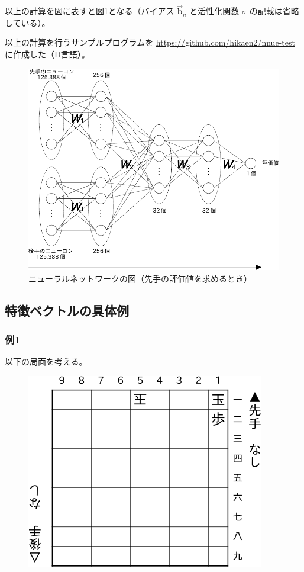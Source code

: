 \documentclass[11pt,a4paper]{ltjsarticle}
\begin{document}
以上の計算を図に表すと図\ref{fig4}となる（バイアス $\vec{\bm{b}}_n$ と活性化関数 $\sigma$ の記載は省略している）。

以上の計算を行うサンプルプログラムを \url{https://github.com/hikaen2/nnue-test} に作成した（D言語）。



\begin{figure}
  \centering
  \includegraphics[width=12cm]{fig/fig4.pdf}
  \caption{ニューラルネットワークの図（先手の評価値を求めるとき）}
  \label{fig4}
\end{figure}




\subsection{特徴ベクトルの具体例}

\subsubsection*{例1}

以下の局面を考える。

\nopagebreak
\begin{figure}[H]
  \centering
  \includegraphics{fig/fig2.pdf}
\end{figure}
\end{document}
